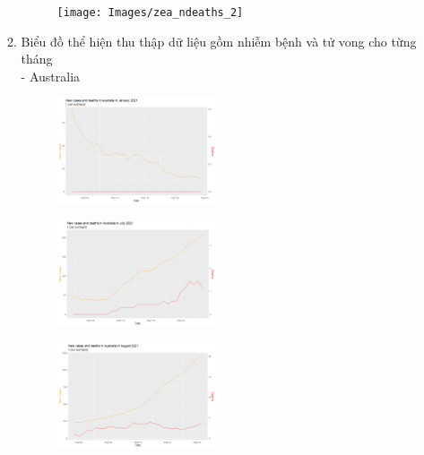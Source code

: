 \documentclass[a4paper]{article}
\theoremstyle{definition}
\begin{document}
\begin{enumerate}[i)]
\begin{enumerate}[1)]
		\begin{figure} [!htp]
  		\centering
  		\texttt{[image: Images/zea\_ndeaths\_2]}
		\end{figure}
    \item Biểu đồ thể hiện thu thập dữ liệu gồm nhiễm bệnh và tử vong cho từng tháng\\
    - Australia\\
		\begin{figure} [!htp]
  		\centering
  		\includegraphics [width=0.47\textwidth] {Images/aus_cad_7}
		\end{figure}
		
		\begin{figure} [!htp]
  		\centering
  		\includegraphics [width=0.47\textwidth] {Images/aus_cad_6}
		\end{figure}
		
		\begin{figure} [!htp]
  		\centering
  		\includegraphics [width=0.47\textwidth] {Images/aus_cad_4}
		\end{figure}
		

\end{enumerate}
\end{enumerate}
\end{document}
